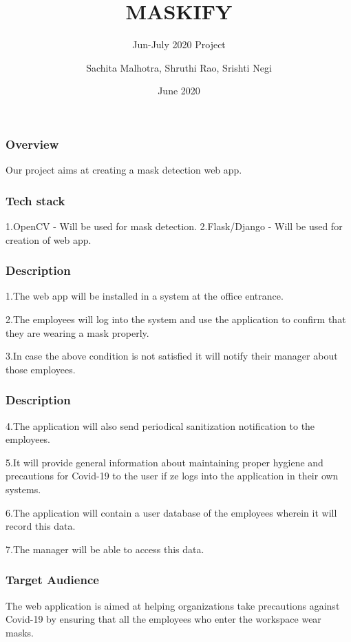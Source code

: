 \documentclass[14pt]{beamer}
\title{MASKIFY}
\subtitle{Jun-July 2020 Project}
\author[TEAM 6]{Sachita Malhotra, Shruthi Rao, Srishti Negi}
\date{June 2020}
\begin{document}
\begin{frame}
    \titlepage
\end{frame}

\begin{frame}
    \frametitle{Overview}
    Our project aims at creating a mask detection web app.
\end{frame}

\begin{frame}
    \frametitle{Tech stack}
    1.OpenCV - Will be used for mask detection.
    2.Flask/Django - Will be used for creation of web app.
\end{frame} 

\begin{frame}
    \frametitle{Description}
    1.The web app will be installed in a system at the office entrance.

    2.The employees will log into the system and use the application to confirm that they are wearing a mask properly.

    3.In case the above condition is not satisfied it will notify their manager about those employees.
\end{frame}

\begin{frame}
    \frametitle{Description}
    4.The application will also send periodical sanitization notification to the employees.
    
    5.It will provide general information about maintaining proper hygiene and precautions for Covid-19 to the user if ze logs into the application in their own systems.
    
    6.The application will contain a user database of the employees wherein it will record this data.
    
    7.The manager will be able to access this data.
\end{frame}

\begin{frame}
    \frametitle{Target Audience}
    The web application is  aimed at helping organizations take precautions against Covid-19 by ensuring that all the employees who enter the workspace wear masks.
\end{frame}
\end{document}
